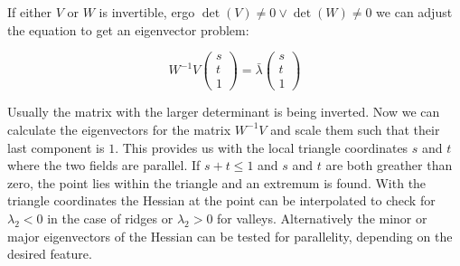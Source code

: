 \noindent If either $V$ or $W$ is invertible, ergo $\det{(V)}\neq 0 \vee
\det{(W)}\neq 0$ we can adjust the equation to get an eigenvector
problem:

\begin{equation}
  W^{-1} V
  \begin{pmatrix}
    s\\
    t\\
    1
  \end{pmatrix}
  = \bar{\lambda}
  \begin{pmatrix}
    s\\
    t\\
    1
  \end{pmatrix}
\end{equation}

\noindent Usually the matrix with the larger determinant is being
inverted. Now we can calculate the eigenvectors for the matrix $W^{-1}
V$ and scale them such that their last component is $1$. This provides
us with the local triangle coordinates $s$ and $t$ where the two fields
are parallel. If $s+t \leq 1$ and $s$ and $t$ are both greather than
zero, the point lies within the triangle and an extremum is found. With
the triangle coordinates the Hessian at the point can be interpolated to
check for $\lambda_2 < 0$ in the case of ridges or $\lambda_2 > 0$ for
valleys. Alternatively the minor or major eigenvectors of the Hessian
can be tested for parallelity, depending on the desired feature.
